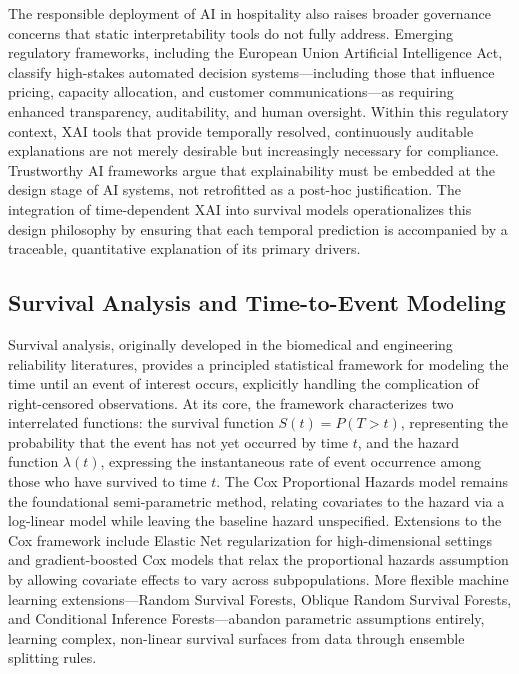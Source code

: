 \documentclass[pdflatex,sn-mathphys-ay]{sn-jnl}
\theoremstyle{thmstyleone}%
\theoremstyle{thmstyletwo}%
\theoremstyle{thmstylethree}%
\begin{document}
The responsible deployment of AI in hospitality also raises broader governance concerns that static interpretability tools do not fully address. Emerging regulatory frameworks, including the European Union Artificial Intelligence Act, classify high-stakes automated decision systems—including those that influence pricing, capacity allocation, and customer communications—as requiring enhanced transparency, auditability, and human oversight. Within this regulatory context, XAI tools that provide temporally resolved, continuously auditable explanations are not merely desirable but increasingly necessary for compliance. Trustworthy AI frameworks \citep{thiebes2021trustworthy, meske2022explainable} argue that explainability must be embedded at the design stage of AI systems, not retrofitted as a post-hoc justification. The integration of time-dependent XAI into survival models operationalizes this design philosophy by ensuring that each temporal prediction is accompanied by a traceable, quantitative explanation of its primary drivers.

\subsection{Survival Analysis and Time-to-Event Modeling}

Survival analysis, originally developed in the biomedical and engineering reliability literatures, provides a principled statistical framework for modeling the time until an event of interest occurs, explicitly handling the complication of right-censored observations. At its core, the framework characterizes two interrelated functions: the survival function $S(t) = P(T > t)$, representing the probability that the event has not yet occurred by time $t$, and the hazard function $\lambda(t)$, expressing the instantaneous rate of event occurrence among those who have survived to time $t$. The Cox Proportional Hazards model \citep{kleinbaum2012survival} remains the foundational semi-parametric method, relating covariates to the hazard via a log-linear model while leaving the baseline hazard unspecified. Extensions to the Cox framework include Elastic Net regularization for high-dimensional settings and gradient-boosted Cox models that relax the proportional hazards assumption by allowing covariate effects to vary across subpopulations. More flexible machine learning extensions—Random Survival Forests, Oblique Random Survival Forests, and Conditional Inference Forests—abandon parametric assumptions entirely, learning complex, non-linear survival surfaces from data through ensemble splitting rules.
\end{document}
